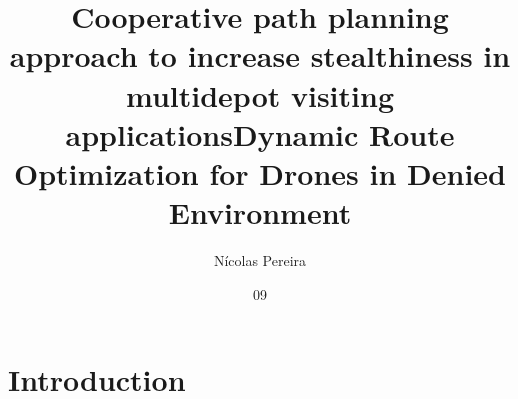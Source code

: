 \documentclass[quali, eng]{ita}    %
\author{N\'{i}colas Pereira}{Borges}
\title{Cooperative path planning approach to increase stealthiness in multidepot visiting applications}
\title{Dynamic Route Optimization for Drones in Denied Environment}
\date{09}{September}{2019}
\begin{document}
\maketitle



%

\thispagestyle{empty}
\ifhyperref{}\fi
\begin{flushright}
\begin{spacing}{1}
\end{spacing}
\end{flushright}

\begin{abstract}
\noindent

\end{abstract}

\begin{englishabstract}
\noindent

\end{englishabstract}

\listoffigures %


\listofabbreviations



\tableofcontents

\mainmatter

\chapter{Introduction} \label{chap:1}

\end{document}
